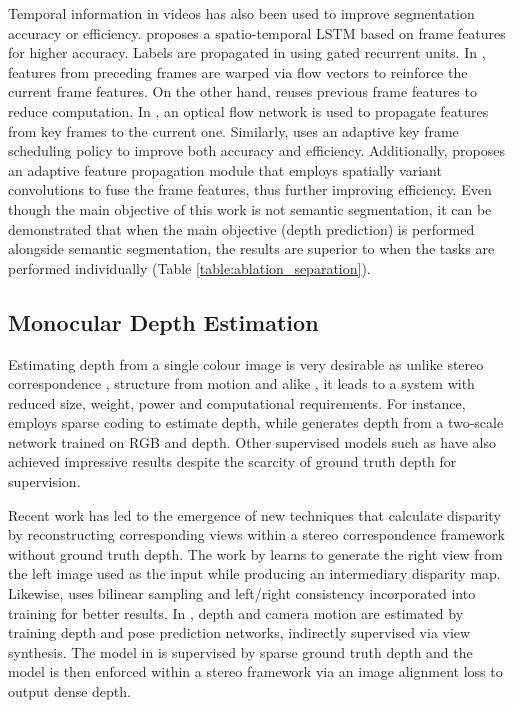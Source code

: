 \documentclass[10pt,twocolumn,letterpaper]{article}
\begin{document}
Temporal information in videos has also been used to improve segmentation accuracy or efficiency. \cite{fayyaz2016stfcn} proposes a spatio-temporal LSTM based on frame features for higher accuracy. Labels are propagated in \cite{nilsson2016semantic} using gated recurrent units. In \cite{gadde2017semantic}, features from preceding frames are warped via flow vectors to reinforce the current frame features. On the other hand, \cite{shelhamer2016clockwork} reuses previous frame features to reduce computation. In \cite{zhu17dff}, an optical flow network \cite{dosovitskiy2015flownet} is used to propagate features from key frames to the current one. Similarly, \cite{xu2018dynamic} uses an adaptive key frame scheduling policy to improve both accuracy and efficiency. Additionally, \cite{li2018low} proposes an adaptive feature propagation module that employs spatially variant convolutions to fuse the frame features, thus further improving efficiency. Even though the main objective of this work is not semantic segmentation, it can be demonstrated that when the main objective (depth prediction) is performed alongside semantic segmentation, the results are superior to when the tasks are performed individually (Table \ref{table:ablation_separation}).\vspace{-0.15cm}

\subsection{Monocular Depth Estimation}
\label{ssec:estimation_related}\vspace{-0.1cm}

Estimating depth from a single colour image is very desirable as unlike stereo correspondence \cite{scharstein2002taxonomy}, structure from motion \cite{cavestany15robot} and alike \cite{abrams2012heliometric, tao2015depth}, it leads to a system with reduced size, weight, power and computational requirements. For instance, \cite{baig2014im2depth} employs sparse coding to estimate depth, while \cite{eigen2015predicting, eigen2014depth} generates depth from a two-scale network trained on RGB and depth. Other supervised models such as \cite{laina2016deeper, li2015depth} have also achieved impressive results despite the scarcity of ground truth depth for supervision.

Recent work has led to the emergence of new techniques that calculate disparity by reconstructing corresponding views within a stereo correspondence framework without ground truth depth. The work by \cite{xie2016deep3d} learns to generate the right view from the left image used as the input while producing an intermediary disparity map. Likewise, \cite{monodepth17} uses bilinear sampling \cite{jaderberg2015spatial} and left/right consistency incorporated into training for better results. In \cite{zhou2017unsupervised}, depth and camera motion are estimated by training depth and pose prediction networks, indirectly supervised via view synthesis. The model in \cite{kuznietsov2017semi} is supervised by sparse ground truth depth and the model is then enforced within a stereo framework via an image alignment loss to output dense depth.
\end{document}
